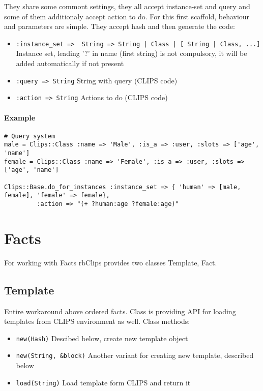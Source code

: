 \documentclass[a4paper,10pt]{article}
\begin{document}
They share some commont settings, they all accept instance-set and query and some of them additionaly accept action to do. For this first scaffold, behaviour and parameters are simple. They accept hash and then generate the code:
\begin{itemize}
 \item \texttt{:instance\_set => { String => String | Class | [ String | Class, ...]}} Instance set, leading '?' in name (first string) is not compulsory, it will be added automatically if not present
 \item \texttt{:query => String} String with query (CLIPS code)
 \item \texttt{:action => String} Actions to do (CLIPS code)
\end{itemize}

\paragraph{Example}
\begin{verbatim}
# Query system
male = Clips::Class :name => 'Male', :is_a => :user, :slots => ['age', 'name']
female = Clips::Class :name => 'Female', :is_a => :user, :slots => ['age', 'name']

Clips::Base.do_for_instances :instance_set => { 'human' => [male, female], 'female' => female},
         :action => "(+ ?human:age ?female:age)"
\end{verbatim}

\section{Facts}
For working with Facts rbClips provides two classes Template, Fact.

\subsection{Template}
Entire workaround above ordered facts. Class is providing API for loading templates from CLIPS environment as well. Class methods:
\begin{itemize}
 \item \texttt{new(Hash)} Descibed below, create new template object
 \item \texttt{new(String, \&block)} Another variant for creating new template, described below
 \item \texttt{load(String)} Load template form CLIPS and return it
\end{itemize}
\end{document}

